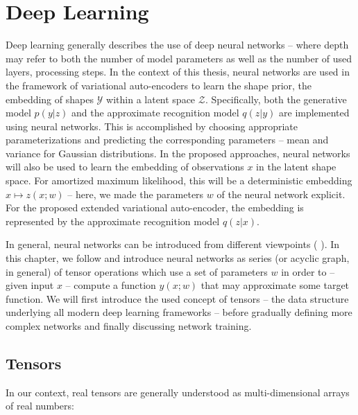\chapter{Deep Learning}
\label{ch:deep-learning}

Deep learning generally describes the use of deep neural networks
\cite{GoodfellowBengioCourville:2016} -- where depth may refer to both the number of model
parameters as well as the number of used layers, \ie processing steps.
In the context of this thesis, neural networks are used in the framework
of variational auto-encoders to learn the shape prior, \ie the embedding
of shapes $\mathcal{Y}$ within a latent space $\mathcal{Z}$. Specifically,
both the generative model $p(y | z)$ and the approximate recognition model
$q(z | y)$ are implemented using neural networks.
This is accomplished by choosing appropriate parameterizations and predicting
the corresponding parameters -- \eg mean and variance for Gaussian distributions.
In the proposed approaches, neural networks will also be used to learn the embedding
of observations $x$ in the latent shape space. For amortized maximum likelihood,
this will be a deterministic embedding $x \mapsto z(x;w)$ -- here, we
made the parameters $w$ of the neural network explicit. For the proposed
extended variational auto-encoder, the embedding is represented by the
approximate recognition model $q(z | x)$.

In general, neural networks can be introduced from different viewpoints (\cf
\cite{Bishop:2006,DudaHartStork:2001,Bishop:1995,Haykin:2005,GoodfellowBengioCourville:2016}).
In this chapter, we follow \cite{GoodfellowBengioCourville:2016} 
and introduce neural networks as series (or acyclic graph, in general) of
tensor operations which use a set of parameters $w$ in order to -- given input $x$ --
compute a function $y(x;w)$ that may approximate some target function.
We will first introduce the used concept of tensors -- the data structure
underlying all modern deep learning frameworks -- before gradually
defining more complex networks and finally discussing network training.

\section{Tensors}

In our context, real tensors are generally understood as multi-dimensional arrays
\cite[Section~2.1]{GoodfellowBengioCourville:2016} of real numbers:

